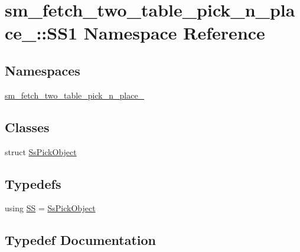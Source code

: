 \hypertarget{namespacesm__fetch__two__table__pick__n__place__1_1_1SS1}{}\section{sm\+\_\+fetch\+\_\+two\+\_\+table\+\_\+pick\+\_\+n\+\_\+place\+\_\+:\+:S\+S1 Namespace Reference}
\label{namespacesm__fetch__two__table__pick__n__place__1_1_1SS1}
\subsection*{Namespaces}
\begin{DoxyCompactItemize}
\item 
 \hyperlink{namespacesm__fetch__two__table__pick__n__place__1_1_1SS1_1_1sm__fetch__two__table__pick__n__place__1}{sm\+\_\+fetch\+\_\+two\+\_\+table\+\_\+pick\+\_\+n\+\_\+place\+\_}
\end{DoxyCompactItemize}
\subsection*{Classes}
\begin{DoxyCompactItemize}
\item 
struct \hyperlink{structsm__fetch__two__table__pick__n__place__1_1_1SS1_1_1SsPickObject}{Ss\+Pick\+Object}
\end{DoxyCompactItemize}
\subsection*{Typedefs}
\begin{DoxyCompactItemize}
\item 
using \hyperlink{namespacesm__fetch__two__table__pick__n__place__1_1_1SS1_a7d071fc321ab48aa1ba1f23ae142aae4}{SS} = \hyperlink{structsm__fetch__two__table__pick__n__place__1_1_1SS1_1_1SsPickObject}{Ss\+Pick\+Object}
\end{DoxyCompactItemize}


\subsection{Typedef Documentation}
\mbox{\label{namespacesm__fetch__two__table__pick__n__place__1_1_1SS1_a7d071fc321ab48aa1ba1f23ae142aae4}} 
